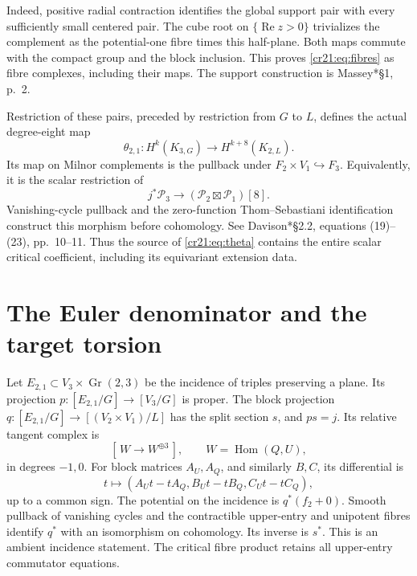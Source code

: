 Indeed, positive radial contraction identifies the global support pair
with every sufficiently small centered pair.
The cube root on $\{\operatorname{Re}z>0\}$ trivializes the complement
as the potential-one fibre times this half-plane.
Both maps commute with the compact group and the block inclusion.
This proves \eqref{cr21:eq:fibres} as fibre complexes, including their maps.
The support construction is Massey\cite{schMasseyST}*{\S1, p.~2}.

Restriction of these pairs, preceded by restriction from $G$ to $L$,
defines the actual degree-eight map
\begin{equation}
 \theta_{2,1}:H^k(K_{3,G})\longrightarrow H^{k+8}(K_{2,L}).
 \label{cr21:eq:theta}
\end{equation}
Its map on Milnor complements is the pullback under
$F_2\times V_1\hookrightarrow F_3$.
Equivalently, it is the scalar restriction of
\[
 j^*\mathcal P_3\longrightarrow
       (\mathcal P_2\boxtimes\mathcal P_1)[8].
\]
Vanishing-cycle pullback and the zero-function Thom--Sebastiani
identification construct this morphism before cohomology.
See Davison\cite{cr11Davison}*{\S2.2, equations (19)--(23), pp.~10--11}.
Thus the source of \eqref{cr21:eq:theta} contains the entire scalar
critical coefficient, including its equivariant extension data.

\section{The Euler denominator and the target torsion}
\label{cr21:sec:target}

Let $E_{2,1}\subset V_3\times\operatorname{Gr}(2,3)$ be the
incidence of triples preserving a plane.
Its projection $p:[E_{2,1}/G]\to[V_3/G]$ is proper.
The block projection $q:[E_{2,1}/G]\to[(V_2\times V_1)/L]$
has the split section $s$, and $ps=j$.
Its relative tangent complex is
\[
 [\,W\longrightarrow W^{\oplus3}\,],
 \qquad W=\operatorname{Hom}(Q,U),
\]
in degrees $-1,0$.
For block matrices $A_U,A_Q$, and similarly $B,C$, its differential is
\[
 t\longmapsto(A_Ut-tA_Q,B_Ut-tB_Q,C_Ut-tC_Q),
\]
up to a common sign.
The potential on the incidence is $q^*(f_2+0)$.
Smooth pullback of vanishing cycles and the contractible upper-entry
and unipotent fibres identify $q^*$ with an isomorphism on cohomology.
Its inverse is $s^*$.
This is an ambient incidence statement. The critical fibre product
retains all upper-entry commutator equations.

